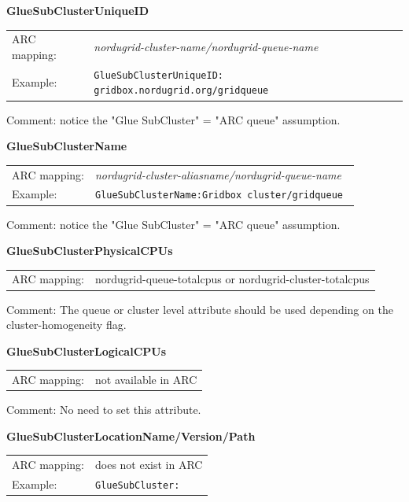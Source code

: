 \documentclass{article}
\begin{document}
\hspace*{0.5cm}
\begin{shaded}
 \textbf{GlueSubClusterUniqueID} 
\end{shaded}
\begin{tabular}{lp{10cm}}  
  ARC mapping:& {\it nordugrid-cluster-name/nordugrid-queue-name}\\
  Example:& \verb#GlueSubClusterUniqueID: gridbox.nordugrid.org/gridqueue#\\
\end{tabular}

Comment: notice the "Glue SubCluster" = "ARC queue" assumption.


\hspace*{0.5cm}
\begin{shaded}
 \textbf{GlueSubClusterName} 
\end{shaded}
\begin{tabular}{lp{10cm}}  
  ARC mapping:& {\it nordugrid-cluster-aliasname/nordugrid-queue-name}\\
  Example:& \verb#GlueSubClusterName:Gridbox cluster/gridqueue #\\
\end{tabular}

Comment: notice the "Glue SubCluster" = "ARC queue" assumption.


\hspace*{0.5cm}
\begin{shaded}
 \textbf{GlueSubClusterPhysicalCPUs} 
\end{shaded}
\begin{tabular}{lp{10cm}}  
  ARC mapping:& nordugrid-queue-totalcpus or nordugrid-cluster-totalcpus\\ 
\end{tabular}

Comment: The queue or cluster level attribute should be used depending on the 
cluster-homogeneity flag.


\hspace*{0.5cm}
\begin{shaded}
 \textbf{GlueSubClusterLogicalCPUs} 
\end{shaded}
\begin{tabular}{lp{10cm}}  
  ARC mapping:& not available in ARC\\ 
\end{tabular}

Comment: No need to set this attribute.


\hspace*{0.5cm}
\begin{shaded}
 \textbf{GlueSubClusterLocationName/Version/Path} 
\end{shaded}
\begin{tabular}{lp{10cm}}  
  ARC mapping:& does not exist in ARC\\
  Example:& \verb#GlueSubCluster:#\\
\end{tabular}
\end{document}
